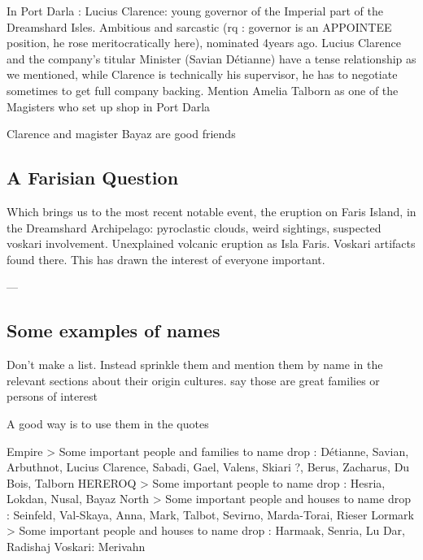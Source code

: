 In Port Darla : Lucius Clarence: young governor of the Imperial part of the Dreamshard Isles. Ambitious and sarcastic (rq : governor is an APPOINTEE position, he rose meritocratically here), nominated 4years ago. Lucius Clarence and the company's titular Minister (Savian Détianne) have a tense relationship as we mentioned, while Clarence is technically his supervisor, he has to negotiate sometimes to get full company backing. Mention Amelia Talborn as one of the Magisters who set up shop in Port Darla

Clarence and magister Bayaz are good friends


\subsection{A Farisian Question}

Which brings us to the most recent notable event, the eruption on Faris Island, in the Dreamshard Archipelago: pyroclastic clouds, weird sightings, suspected voskari involvement. Unexplained volcanic eruption as Isla Faris. Voskari artifacts found there. This has drawn the interest of everyone important.



---



\subsection{Some examples of names}

Don't make a list. Instead sprinkle them and mention them by name in the relevant sections about their origin cultures. say those are great families or persons of interest

A good way is to use them in the quotes

Empire > Some important people and families to name drop : Détianne, Savian, Arbuthnot, Lucius Clarence, Sabadi, Gael, Valens, Skiari ?, Berus, Zacharus, Du Bois, Talborn
HEREROQ > Some important people to name drop : Hesria, Lokdan, Nusal, Bayaz
North > Some important people and houses to name drop : Seinfeld, Val-Skaya, Anna, Mark, Talbot, Sevirno, Marda-Torai, Rieser
Lormark > Some important people and houses to name drop : Harmaak, Senria, Lu Dar, Radishaj
Voskari: Merivahn

